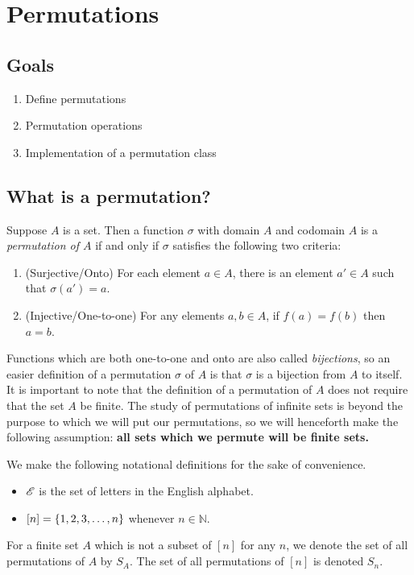 \documentclass[m3380-lec-main.tex]{subfiles}
\begin{document}
\chapter{Permutations}

\section*{Goals}
\begin{enumerate}[1.~]\setlength{\itemsep}{0pt}
\item Define permutations
\item Permutation operations
\item Implementation of a permutation class
\end{enumerate}

\section{What is a permutation?}
\begin{defn} Suppose $A$ is a set. Then a function $\sigma$ with domain $A$ and codomain $A$ is a \emph{permutation of $A$} if and only if $\sigma$ satisfies the following two criteria:
\begin{enumerate}[\bfseries i.]
\item (Surjective/Onto) For each element $a\in A$, there is an element $a'\in A$ such that ${\sigma(a') = a}$.
\item (Injective/One-to-one) For any elements $a,b\in A$, if $f(a)=f(b)$ then $a=b$.
\end{enumerate}
\end{defn}
Functions which are both one-to-one and onto are also called \emph{bijections}, so an easier definition of a permutation $\sigma$ of $A$ is that $\sigma$ is a bijection from $A$ to itself. It is important to note that the definition of a permutation of $A$ does not require that the set $A$ be finite. The study of permutations of infinite sets is beyond the purpose to which we will put our permutations, so we will henceforth make the following assumption: \textbf{all sets which we permute will be finite sets.}

\begin{defn} We make the following notational definitions for the sake of convenience.
\begin{itemize}
\item $\mathscr{E}$ is the set of letters in the English alphabet.
\item $[n] = \left\{1,2,3,\ldots,n\right\}$ whenever $n\in \mathbb{N}$.
\end{itemize}
For a finite set $A$ which is not a subset of $[n]$ for any $n$, we denote the set of all permutations of $A$ by $S_A$. The set of all permutations of $[n]$ is denoted $S_n$.
\end{defn}
\end{document}
